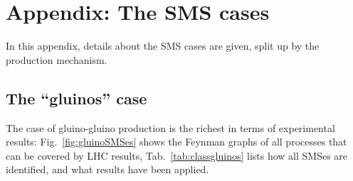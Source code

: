 \FloatBarrier

\section{Appendix: The SMS cases}
\label{app:smscases}
In this appendix, details about the SMS cases are given, split up by the
production mechanism.

\subsection{The ``gluinos'' case}
\label{ssec:gluinocase}
The case of gluino-gluino production is the richest in terms of experimental results:
Fig.~\ref{fig:gluinoSMSes} shows the Feynman graphs of all processes that can be covered by LHC results, Tab.~\ref{tab:classgluinos} lists how all SMSes are identified, and what results have been applied.

